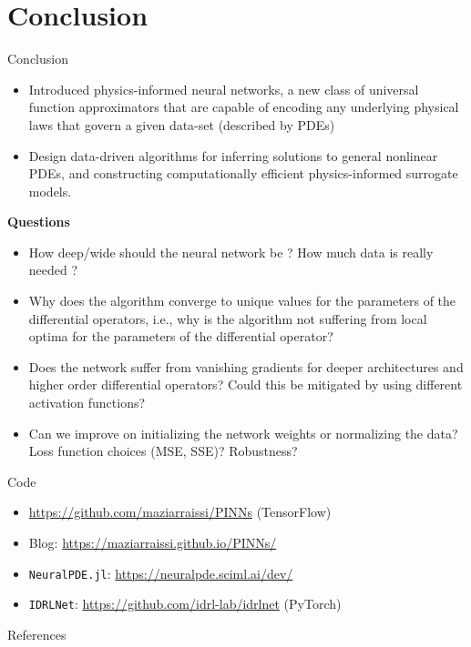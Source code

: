 \documentclass[xcolor=dvipsnames,10pt]{beamer}
\begin{document}
\section{Conclusion}
\begin{frame}[t]{Conclusion}
  \begin{itemize}
    \item<2-> Introduced physics-informed neural networks, a new class of universal function approximators that are capable of encoding any underlying physical laws that govern a given data-set (described by PDEs)
    \item<3-> Design data-driven algorithms for inferring solutions to general nonlinear PDEs, and constructing computationally efficient physics-informed surrogate models.
  \end{itemize}

  {\bf Questions}
  \begin{itemize}
    \item<4-> How deep/wide should the neural network be ? How much data is really needed ?
    \item<5-> Why does the algorithm converge to unique values for the parameters of the differential operators, i.e., why is the algorithm not suffering from local optima for the parameters of the differential operator?
    \item<6-> Does the network suffer from vanishing gradients for deeper architectures and higher order differential operators? Could this be mitigated by using different activation functions?
    \item<7-> Can we improve on initializing the network weights or normalizing the data? Loss function choices (MSE, SSE)? Robustness? 
  \end{itemize}
\end{frame}
\begin{frame}[t]{Code}
  \begin{itemize}
    \item<2-> \url{https://github.com/maziarraissi/PINNs} (TensorFlow)
    \item<3-> Blog: \url{https://maziarraissi.github.io/PINNs/}
    \item<4-> \texttt{NeuralPDE.jl}: \url{https://neuralpde.sciml.ai/dev/}
    \item<5-> \texttt{IDRLNet}: \url{https://github.com/idrl-lab/idrlnet} (PyTorch)
  \end{itemize}
\end{frame}
\begin{frame}[t]{References}
  \footnotesize
    
    
\end{frame}
\end{document}
